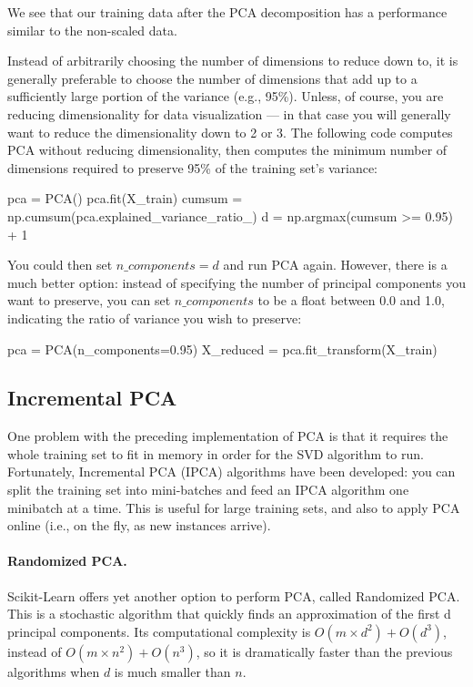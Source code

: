 \documentclass[%
oneside,                 %
final,                   %
10pt]{article}
\begin{document}
\epycod


We see that our training data after the PCA decomposition has a performance similar to the non-scaled data. 

Instead of arbitrarily choosing the number of dimensions to reduce down to, it is generally preferable to
choose the number of dimensions that add up to a sufficiently large portion of the variance (e.g., 95\%).
Unless, of course, you are reducing dimensionality for data visualization — in that case you will
generally want to reduce the dimensionality down to 2 or 3.
The following code computes PCA without reducing dimensionality, then computes the minimum number
of dimensions required to preserve 95\% of the training set’s variance:





\bpycod
pca = PCA()
pca.fit(X_train)
cumsum = np.cumsum(pca.explained_variance_ratio_)
d = np.argmax(cumsum >= 0.95) + 1

\epycod

You could then set $n\_components=d$ and run PCA again. However, there is a much better option: instead
of specifying the number of principal components you want to preserve, you can set $n\_components$ to be
a float between 0.0 and 1.0, indicating the ratio of variance you wish to preserve:



\bpycod
pca = PCA(n_components=0.95)
X_reduced = pca.fit_transform(X_train)

\epycod


\subsection{Incremental PCA}

One problem with the preceding implementation of PCA is that it requires the whole training set to fit in
memory in order for the SVD algorithm to run. Fortunately, Incremental PCA (IPCA) algorithms have
been developed: you can split the training set into mini-batches and feed an IPCA algorithm one minibatch
at a time. This is useful for large training sets, and also to apply PCA online (i.e., on the fly, as new
instances arrive).

\paragraph{Randomized PCA.}
Scikit-Learn offers yet another option to perform PCA, called Randomized PCA. This is a stochastic
algorithm that quickly finds an approximation of the first d principal components. Its computational
complexity is $O(m \times d^2)+O(d^3)$, instead of $O(m \times n^2) + O(n^3)$, so it is dramatically faster than the
previous algorithms when $d$ is much smaller than $n$.
\end{document}
